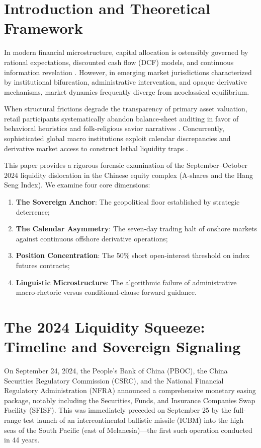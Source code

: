 \documentclass[11pt,a4paper]{article}
\begin{document}
\newpage

\section{Introduction and Theoretical Framework}

In modern financial microstructure, capital allocation is ostensibly governed by rational expectations, discounted cash flow (DCF) models, and continuous information revelation \cite{fama1970efficient, kyle1985continuous}. However, in emerging market jurisdictions characterized by institutional bifurcation, administrative intervention, and opaque derivative mechanisms, market dynamics frequently diverge from neoclassical equilibrium. 

When structural frictions degrade the transparency of primary asset valuation, retail participants systematically abandon balance-sheet auditing in favor of behavioral heuristics and folk-religious savior narratives \cite{shiller2000irrational, barber2000trading}. Concurrently, sophisticated global macro institutions exploit calendar discrepancies and derivative market access to construct lethal liquidity traps \cite{brunnermeier2009market}.

This paper provides a rigorous forensic examination of the September--October 2024 liquidity dislocation in the Chinese equity complex (A-shares and the Hang Seng Index). We examine four core dimensions:
\begin{enumerate}
    \item \textbf{The Sovereign Anchor}: The geopolitical floor established by strategic deterrence;
    \item \textbf{The Calendar Asymmetry}: The seven-day trading halt of onshore markets against continuous offshore derivative operations;
    \item \textbf{Position Concentration}: The 50\% short open-interest threshold on index futures contracts;
    \item \textbf{Linguistic Microstructure}: The algorithmic failure of administrative macro-rhetoric versus conditional-clause forward guidance.
\end{enumerate}

\section{The 2024 Liquidity Squeeze: Timeline and Sovereign Signaling}

On September 24, 2024, the People's Bank of China (PBOC), the China Securities Regulatory Commission (CSRC), and the National Financial Regulatory Administration (NFRA) announced a comprehensive monetary easing package, notably including the Securities, Funds, and Insurance Companies Swap Facility (SFISF). This was immediately preceded on September 25 by the full-range test launch of an intercontinental ballistic missile (ICBM) into the high seas of the South Pacific (east of Melanesia)—the first such operation conducted in 44 years.
\end{document}
